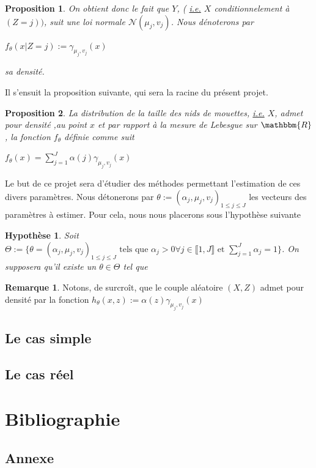 \documentclass[frenchb]{report}
\newcommand{\R}{\mathbbm{R}}
\newcommand{\1}{\mathbbm{1}}
\newcommand{\n}{\mathcal{N}}
\newtheorem{prop}{Proposition}
\newtheorem{hyp}{Hypothèse}
\theoremstyle{definition}\newtheorem{defn}{Définition}
\theoremstyle{definition}\newtheorem{exm}{Exemple}
\theoremstyle{definition}\newtheorem{rem}{Remarque}
\begin{document}
\begin{prop}
On obtient donc le fait que $Y$, ( \underline{i.e.} $X$ conditionnelement à $(Z=j))$, suit une loi normale $\n(\mu_j,v_j)$. Nous dénoterons par 
\begin{center} $f_\theta(x | Z=j) := \gamma_{\mu_j, v_j}(x)$ \end{center}
sa densité.
\end{prop}

Il s'ensuit la proposition suivante, qui sera la racine du présent projet.
\begin{prop}
La distribution de la taille des nids de mouettes, \underline{i.e.} $X$, admet pour densité ,au point $x$ et par rapport à la mesure de Lebesgue sur $\R$, la fonction $f_ \theta$ définie comme suit
\begin{center} $f_\theta(x) = \displaystyle\sum_{j=1}^J \alpha(j) \gamma_{\mu_j, v_j}(x) $ \end{center}
\end{prop}

Le but de ce projet sera d'étudier des méthodes permettant l'estimation de ces divers paramètres. Nous détonerons par $\theta := (\alpha_j, \mu_j, v_j)_{1\leq j\leq J}$ les vecteurs des paramètres à estimer. \newline
Pour cela, nous nous placerons sous l'hypothèse suivante

\begin{hyp}
Soit $\Theta := \{ \theta = (\alpha_j,\mu_j, v_j)_{1 \leq j \leq J} \text{ tels que } \alpha_j > 0 \forall j\in \llbracket 1,J\rrbracket \text{ et } \displaystyle\sum_{j=1}^J\alpha_j=1\}$. On supposera qu'il existe un $\theta \in \Theta$ tel que 
\end{hyp}

\begin{rem}
Notons, de surcroît, que le couple aléatoire $(X,Z)$ admet pour densité par la fonction $h_\theta(x,z) := \alpha(z) \gamma_{\mu_j, v_j}(x)$
\end{rem}

\section{Le cas simple}

\section{Le cas réel}

\pagebreak

\chapter*{Bibliographie}



\pagebreak
\begin{appendix}
\chapter{Annexe}

\end{appendix}
\end{document}
